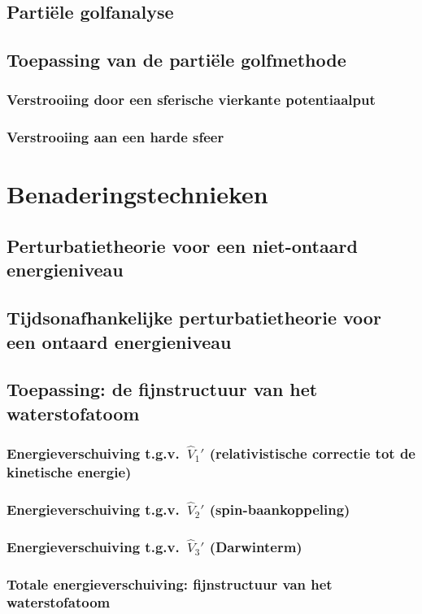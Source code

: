 \documentclass[a4paper,twoside]{article}
\theoremstyle{definition}
\theoremstyle{plain}
\begin{document}
\subsection{Partiële golfanalyse}
\subsection{Toepassing van de partiële golfmethode}
\subsubsection{Verstrooiing door een sferische vierkante potentiaalput}
\subsubsection{Verstrooiing aan een harde sfeer}

\section{Benaderingstechnieken}
\subsection{Perturbatietheorie voor een niet-ontaard energieniveau}
\subsection{Tijdsonafhankelijke perturbatietheorie voor een ontaard energieniveau}
\subsection{Toepassing: de fijnstructuur van het waterstofatoom}
\subsubsection{Energieverschuiving t.g.v.\ $\hat{V}_1'$ (relativistische correctie tot de kinetische energie)}
\subsubsection{Energieverschuiving t.g.v.\ $\hat{V}_2'$ (spin-baankoppeling)}
\subsubsection{Energieverschuiving t.g.v.\ $\hat{V}_3'$ (Darwinterm)}
\subsubsection{Totale energieverschuiving: fijnstructuur van het waterstofatoom}
\end{document}
